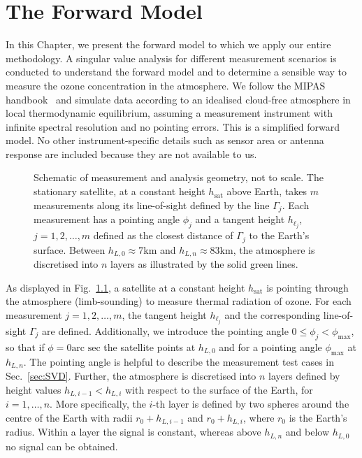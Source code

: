 \chapter{The Forward Model}
\label{ch:formodel}


In this Chapter, we present the forward model to which we apply our entire methodology.
A singular value analysis for different measurement scenarios is conducted to understand the forward model and to determine a sensible way to measure the ozone concentration in the atmosphere. We follow the MIPAS handbook~\cite{mipas2000handbook} and simulate data according to an idealised cloud-free atmosphere in local thermodynamic equilibrium, assuming a measurement instrument with infinite spectral resolution and no pointing errors.
This is a simplified forward model.
No other instrument-specific details such as sensor area or antenna response are included because they are not available to us. 

\begin{figure}[ht!]
	\centering
	
	\caption[Schematic of measurement and analysis geometry.]{Schematic of measurement and analysis geometry, not to scale.
		The stationary satellite, at a constant height $h_\text{sat}$ above Earth, takes $m$ measurements along its line-of-sight defined by the line $\Gamma_j$.
		Each measurement has a pointing angle $\phi_j$ and a tangent height $h_{\ell_j}$, $j=1,2,\dots,m$ defined as the closest distance of $\Gamma_j$ to the Earth's surface.
		Between $h_{L,0} \approx 7$km and $h_{L,n} \approx 83$km, the atmosphere is discretised into $n$ layers as illustrated by the solid green lines.}
	\label{fig:LIMB}
\end{figure}
As displayed in Fig.~\ref{fig:LIMB}, a satellite at a constant height $h_{\text{sat}}$ is pointing through the atmosphere (limb-sounding) to measure thermal radiation of ozone.
For each measurement $j=1,2,\ldots,m$, the tangent height $h_{\ell_j}$ and the corresponding line-of-sight $\Gamma_j$ are defined.
Additionally, we introduce the pointing angle $0 \leq \phi_j < \phi_{\text{max}}$, so that if $\phi = 0 \text{arc sec}$ the satellite points at $h_{L,0}$ and for a pointing angle $\phi_{\text{max}}$ at $h_{L,n}$.
The pointing angle is helpful to describe the measurement test cases in Sec.~\ref{sec:SVD}.
Further, the atmosphere is discretised into $n$ layers defined by height values $h_{L,i-1} < h_{L,i}$ with respect to the surface of the Earth, for $i = 1, \dots, n$.
More specifically, the $i$-th layer is defined by two spheres around the centre of the Earth with radii $ r_0 + h_{L,i-1} $ and $r_0 + h_{L,i}$, where $r_0$ is the Earth's radius.
Within a layer the signal is constant, whereas above $h_{L, n}$ and below $h_{L,0} $ no signal can be obtained.


